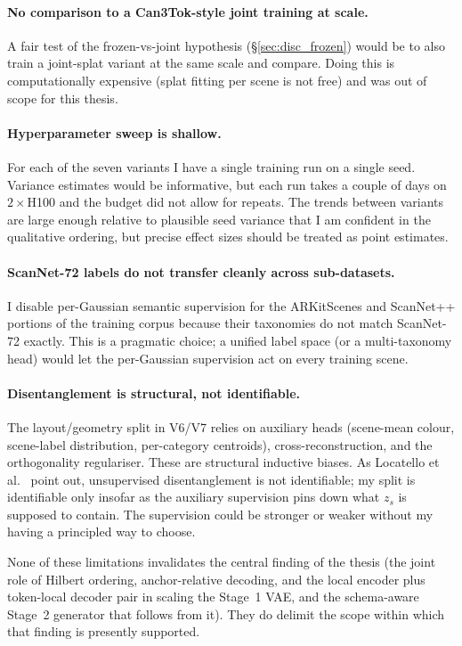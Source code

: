 \paragraph{No comparison to a Can3Tok-style joint training at scale.} A fair test of the frozen-vs-joint hypothesis (\S\ref{sec:disc_frozen}) would be to also train a joint-splat variant at the same scale and compare. Doing this is computationally expensive (splat fitting per scene is not free) and was out of scope for this thesis.

\paragraph{Hyperparameter sweep is shallow.} For each of the seven variants I have a single training run on a single seed. Variance estimates would be informative, but each run takes a couple of days on $2 \times $H100 and the budget did not allow for repeats. The trends between variants are large enough relative to plausible seed variance that I am confident in the qualitative ordering, but precise effect sizes should be treated as point estimates.

\paragraph{ScanNet-72 labels do not transfer cleanly across sub-datasets.} I disable per-Gaussian semantic supervision for the ARKitScenes and ScanNet++ portions of the training corpus because their taxonomies do not match ScanNet-72 exactly. This is a pragmatic choice; a unified label space (or a multi-taxonomy head) would let the per-Gaussian supervision act on every training scene.

\paragraph{Disentanglement is structural, not identifiable.} The layout/geometry split in V6/V7 relies on auxiliary heads (scene-mean colour, scene-label distribution, per-category centroids), cross-reconstruction, and the orthogonality regulariser. These are structural inductive biases. As Locatello et al.\ \citep{locatello2019challenging} point out, unsupervised disentanglement is not identifiable; my split is identifiable only insofar as the auxiliary supervision pins down what $z_s$ is supposed to contain. The supervision could be stronger or weaker without my having a principled way to choose.

None of these limitations invalidates the central finding of the thesis (the joint role of Hilbert ordering, anchor-relative decoding, and the local encoder plus token-local decoder pair in scaling the Stage~1 VAE, and the schema-aware Stage~2 generator that follows from it). They do delimit the scope within which that finding is presently supported.